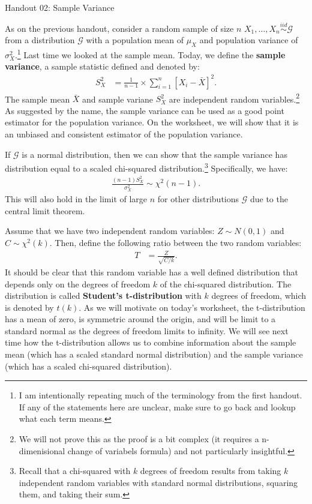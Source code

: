 \documentclass{tufte-handout}
\newcommand{\iid}{\stackrel{iid}{\sim}}
\begin{document}
\justify

{\LARGE Handout 02: Sample Variance}

\vspace*{18pt}

\noindent
As on the previous handout, consider a random sample of size $n$
$X_1, \ldots, X_n \iid \mathcal{G}$ from a distribution $\mathcal{G}$
with a population mean of $\mu_X$ and population variance of
$\sigma^2_X$.\footnote{
  I am intentionally repeating much of the terminology from the first handout.
  If any of the statements here are unclear, make sure to go back and lookup
  what each term means.
}
Last time we looked at the sample mean. Today, we define the
\textbf{sample variance}, a sample statistic defined and denoted by:
\begin{align*}
S^2_X &= \frac{1}{n - 1} \times \sum_{i=1}^n \left[ X_i - \bar{X} \right]^{2}.
\end{align*}
The sample mean $\bar{X}$ and sample variane $S^2_X$ are independent
random variables.\footnote{
  We will not prove this as the proof is a bit complex (it requires a n-dimenisional
  change of variabels formula) and not particularly insightful.
  }
As suggested by the name, the sample variance can be used as a good
point estimator for the population variance. On the worksheet, we will
show that it is an unbiased and consistent estimator of the population
variance.

If $\mathcal{G}$ is a normal distribution, then we can show that the
sample variance has distribution equal to a scaled chi-squared
distribution.\footnote{
  Recall that a chi-squared with $k$ degrees of freedom results from
  taking $k$ independent random variables with standard normal distributions,
  squaring them, and taking their sum.
}
Specifically, we have:
\begin{align*}
\frac{(n-1)S^2_X}{\sigma_X^2} \sim \chi^2(n-1).
\end{align*}
This will also hold in the limit of large $n$ for other distributions $\mathcal{G}$
due to the central limit theorem. 

\vspace*{24pt}

\noindent
Assume that we have two independent random variables: $Z \sim N(0, 1)$ and
$C \sim \chi^2(k)$. Then, define the following ratio between the two random
variables:
\begin{align*}
T &= \frac{Z}{\sqrt{C / k}}.
\end{align*} 
It should be clear that this random variable has a well defined distribution that
depends only on the degrees of freedom $k$ of the chi-squared distribution. The
distribution is called \textbf{Student's t-distribution} with $k$ degrees of freedom,
which is denoted by $t(k)$. As we will motivate on today's worksheet, the t-distribution
has a mean of zero, is symmetric around the origin, and will be limit to a standard
normal as the degrees of freedom limits to infinity. We will see next time how the
t-distribution allows us to combine information about the sample mean (which has a
scaled standard normal distribution) and the sample variance (which has a scaled
chi-squared distribution).
\end{document}
